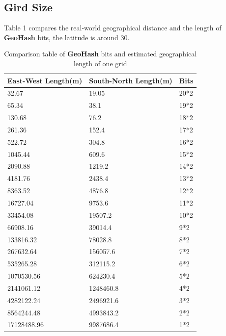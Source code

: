 \documentclass[sigplan,screen]{acmart}
\begin{document}
\subsection{Gird Size}
Table 1 compares the real-world geographical distance and the length of \textbf{GeoHash} bits, the latitude is around 30\degree.
\begin{table}[htb]
	\caption{Comparison table of \textbf{GeoHash} bits and estimated geographical length of one grid}
	\begin{tabular}{lll}
		\toprule
		East-West Length(m) & South-North Length(m) & Bits \\
		\midrule
		32.67               & 19.05                 & 20*2 \\
		65.34               & 38.1                  & 19*2 \\
		130.68              & 76.2                  & 18*2 \\
		261.36              & 152.4                 & 17*2 \\
		522.72              & 304.8                 & 16*2 \\
		1045.44             & 609.6                 & 15*2 \\
		2090.88             & 1219.2                & 14*2 \\
		4181.76             & 2438.4                & 13*2 \\
		8363.52             & 4876.8                & 12*2 \\
		16727.04            & 9753.6                & 11*2 \\
		33454.08            & 19507.2               & 10*2 \\
		66908.16            & 39014.4               & 9*2  \\
		133816.32           & 78028.8               & 8*2  \\
		267632.64           & 156057.6              & 7*2  \\
		535265.28           & 312115.2              & 6*2  \\
		1070530.56          & 624230.4              & 5*2  \\
		2141061.12          & 1248460.8             & 4*2  \\
		4282122.24          & 2496921.6             & 3*2  \\
		8564244.48          & 4993843.2             & 2*2  \\
		17128488.96         & 9987686.4             & 1*2  \\
		\bottomrule
	\end{tabular}
\end{table}
\end{document}
